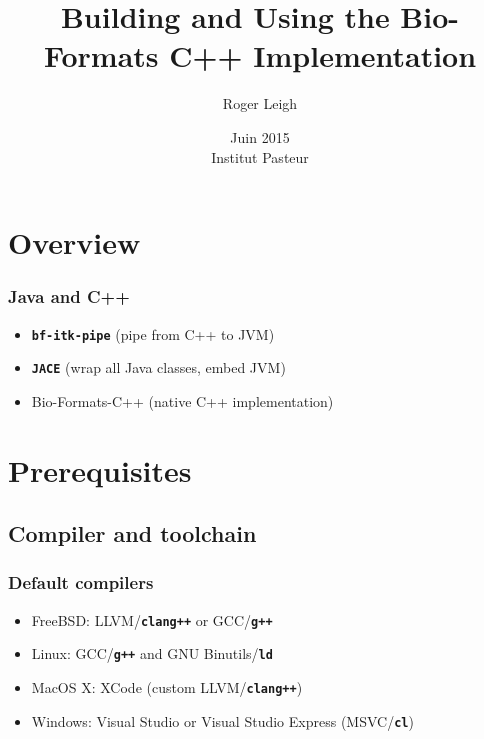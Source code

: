 \documentclass{beamer}
\title{Building and Using the Bio-Formats C++ Implementation}
\author{Roger Leigh}
\date{Juin 2015\\Institut Pasteur}
\newcommand{\cmd}[1]{\textbf{\texttt{#1}}}
\begin{document}
\begin{frame}[plain]
  \titlepage
  \begin{center}
     \hfill
    \hfill
  \end{center}
\end{frame}

\section[]{Overview}

\begin{frame}
  \frametitle{Java and C++}
  \begin{itemize}
  \item \cmd{bf-itk-pipe} (pipe from C++ to JVM)
  \item \cmd{JACE} (wrap all Java classes, embed JVM)
  \item Bio-Formats-C++ (native C++ implementation)
  \end{itemize}
\end{frame}

\section{Prerequisites}
\subsection{Compiler and toolchain}

\begin{frame}
  \frametitle{Default compilers}
  \begin{itemize}
  \item FreeBSD: LLVM/\cmd{clang++} or GCC/\cmd{g++}
  \item Linux: GCC/\cmd{g++} and GNU Binutils/\cmd{ld}
  \item MacOS X: XCode (custom LLVM/\cmd{clang++})
  \item Windows: Visual Studio or Visual Studio Express (MSVC/\cmd{cl})
  \end{itemize}
\end{frame}
\end{document}
